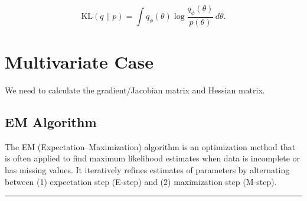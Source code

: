 \documentclass[
  letterpaper,
  DIV=11,
  numbers=noendperiod]{scrreprt}
\begin{document}
\[\text{KL}(q \| p) = \int q_\phi(\theta) \log \frac{q_\phi(\theta)}{p(\theta)} \, d\theta.\]

\section{}\label{section}

\section{Multivariate Case}\label{multivariate-case}

We need to calculate the gradient/Jacobian matrix and Hessian matrix.

\subsection{EM Algorithm}\label{em-algorithm}

The EM (Expectation--Maximization) algorithm is an optimization method
that is often applied to find maximum likelihood estimates when data is
incomplete or has missing values. It iteratively refines estimates of
parameters by alternating between (1) expectation step (E-step) and (2)
maximization step (M-step).

\begin{center}\rule{0.5\linewidth}{0.5pt}\end{center}
\end{document}
